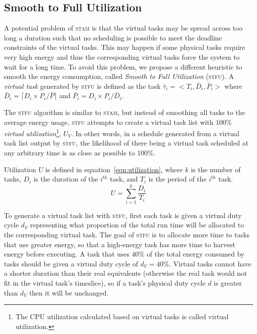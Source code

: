 \subsection{Smooth to Full Utilization}

A potential problem of \textsc{stam} is that the virtual tasks may be spread across too long a duration such that no scheduling is possible to meet the deadline constraints of the virtual tasks. This may happen if some physical tasks require very high energy and thus the corresponding virtual tasks force the system to wait for a long time. To avoid this problem, we propose a different heuristic to smooth the energy consumption, called \emph{Smooth to Full Utilization} (\textsc{stfu}).  A \emph{virtual task} generated by \textsc{stfu} is defined as the task $\bar{\tau}_i = <T_i, \bar{D}_i, \bar{P}_i>$ where $\bar{D}_i = \lceil D_i \times  P_i / \bar{P} \rceil$ and $\bar{P}_i = D_i \times  P_i / \bar{D}_i$.

The \textsc{stfu} algorithm is similar to \textsc{stam}, but instead of smoothing all tasks to the average energy usage, \textsc{stfu} attempts to create a virtual task list with $100\%$ \emph{virtual utilization}\footnote{The CPU utilization calculated based on virtual tasks is called virtual utilization.}, $U_V$.  In other words, in a schedule generated from a virtual task list output by \textsc{stfu}, the likelihood of there being a virtual task scheduled at any arbitrary time is as close as possible to $100\%$.

Utilization $U$ is defined in equation~\ref{eqn:utilization}, where $k$ is the number of tasks, $D_i$ is the duration of the $i^{th}$ task, and $T_i$ is the period of the $i^{th}$ task.
\begin{equation}
\label{eqn:utilization}
U = \sum_{i=1}^{k} \frac{D_i}{T_i}
\end{equation}

To generate a virtual task list with \textsc{stfu}, first each task is given a virtual duty cycle $d_V$ representing what proportion of the total run time will be allocated to the corresponding virtual task.  The goal of \textsc{stfu} is to allocate more time to tasks that use greater energy, so that a high-energy task has more time to harvest energy before executing.  A task that uses $40\%$ of the total energy consumed by tasks should be given a virtual duty cycle of $d_V=40\%$.  Virtual tasks cannot have a shorter duration than their real equivalents (otherwise the real task would not fit in the virtual task's timeslice), so if a task's physical duty cycle $d$ is greater than $d_V$ then it will be unchanged.

